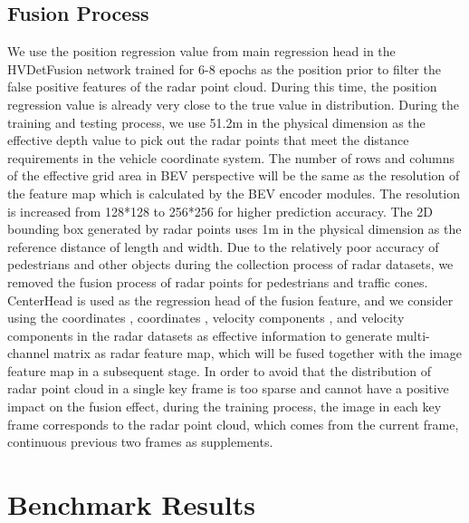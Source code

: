 \documentclass[10pt,twocolumn,letterpaper]{article}
\begin{document}
\subsection{Fusion Process}
We use the position regression value from main regression head in the HVDetFusion network trained for 6-8 epochs as the position prior to filter the false positive features of the radar point cloud. During this time, the position regression value is already very close to the true value in distribution. During the training and testing process, we use 51.2m in the physical dimension as the effective depth value to pick out the radar points that meet the distance requirements in the vehicle coordinate system. The number of rows and columns of the effective grid area in BEV perspective will be the same as  the resolution of the feature map which is calculated by the BEV encoder modules. The resolution is increased from 128*128 to 256*256 for higher prediction accuracy. The 2D bounding box generated by radar points uses 1m in the physical dimension as the reference distance of length and width. Due to the relatively poor accuracy of pedestrians and other objects during the collection process of radar datasets, we removed the fusion process of radar points for pedestrians and traffic cones. CenterHead is used as the regression head of the fusion feature, and we consider using the coordinates , coordinates , velocity components , and velocity components  in the radar datasets as effective information to generate multi-channel matrix as radar feature map, which will be fused together with the image feature map in a subsequent stage. In order to avoid that the distribution of radar point cloud in a single key frame is too sparse and cannot have a positive impact on the fusion effect, during the training process, the image in each key frame corresponds to the radar point cloud, which comes from the current frame, continuous previous two frames as supplements.
\section{Benchmark Results}
\label{sec:resu}
\end{document}
